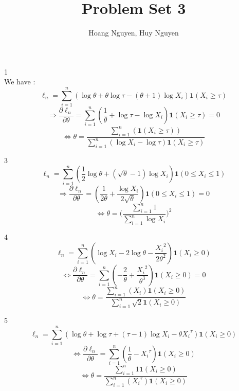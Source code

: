 \documentclass[10pt]{article}
\newenvironment{problem}[2][Problem]{\begin{trivlist}
\item[\hskip \labelsep {\bfseries #1}\hskip \labelsep {\bfseries #2.}]}{\end{trivlist}}
\begin{document}
\title{Problem Set 3}
\author{Hoang Nguyen, Huy Nguyen}
\maketitle


\begin{problem}{1}

\item 1\\

We have :\\


\[\ell_n=\sum_{i=1}^{n}(\log \theta + \theta\log\tau - (\theta+1)\log X_i) \mathbf{1}(X_i \geqslant \tau)\]
\[\Rightarrow \frac{\partial \ell_n}{\partial \theta}=\sum_{i=1}^{n}(\frac{1}{\theta}+ \log \tau-\log X_i) \mathbf{1}(X_i \geqslant \tau)=0\]
\[\Leftrightarrow \theta= \frac{\sum_{i=1}^{n}(\mathbf{1}(X_i \geqslant \tau))}{\sum_{i=1}^{n}(\log X_i-\log \tau)\mathbf{1}(X_i \geqslant \tau)}\]

\item 3\\
\[\ell_n=\sum_{i=1}^{n}(\frac{1}{2}\log \theta+(\sqrt{\theta}-1)\log X_i)\mathbf{1}(0 \leqslant X_i \leqslant1)\]
\[\Rightarrow \frac{\partial \ell_n}{\partial \theta}=(\frac{1}{2\theta}+\frac{\log X_i}{2\sqrt{\theta}})\mathbf{1}(0 \leqslant X_i \leqslant1)=0\]
\[\Leftrightarrow \theta=\Big(\frac{\sum_{i=1}^{n}1}{\sum_{i=1}^{n}\log X_i}\Big)^2\]


\item 4\\
\[\ell_n=\sum_{i=1}^{n}(\log X_i-2\log \theta-\frac{{X_i}^2}{2\theta^2})\mathbf{1}(X_i \geqslant 0)\]
\[\Leftrightarrow \frac{\partial \ell_n}{\partial \theta}=\sum_{i=1}^{n}(-\frac{2}{\theta}+\frac{{X_i}^2}{\theta^3})\mathbf{1}(X_i \geqslant 0)=0\]
\[\Leftrightarrow \theta=\frac{\sum_{i=1}^{n}(X_i)\mathbf{1}(X_i \geqslant 0)}{\sum_{i=1}^{n}\sqrt{2}\mathbf{1}(X_i \geqslant 0)}\]


\item 5\\
\[\ell_n=\sum_{i=1}^{n}(\log \theta+ \log \tau+(\tau-1)\log X_i-\theta{X_i}^{\tau})\mathbf{1}(X_i \geqslant 0)\]
\[\Leftrightarrow \frac{\partial \ell_n}{\partial \theta}=\sum_{i=1}^{n}(\frac{1}{\theta}-{X_i}^{\tau})\mathbf{1}(X_i \geqslant 0)\]
\[\Leftrightarrow \theta=\frac{\sum_{i=1}^{n} 1\mathbf{1}(X_i \geqslant 0) }{\sum_{i=1}^{n} ({X_i}^{\tau})\mathbf{1}(X_i \geqslant 0)}\]



\end{problem}
\end{document}
